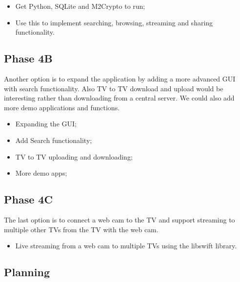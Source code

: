 \begin{itemize}
\item Get Python, SQLite and M2Crypto to run;
\item Use this to implement searching, browsing, streaming and sharing functionality.
\end{itemize}

\subsection*{Phase 4B}
Another option is to expand the application by adding a more advanced GUI with search functionality. 
Also TV to TV download and upload would be interesting rather than downloading from a central server. 
We could also add more demo applications and functions.

\begin{itemize}
\item Expanding the GUI;
\item Add Search functionality;
\item TV to TV uploading and downloading;
\item More demo apps;
\end{itemize}

\subsection*{Phase 4C}
The last option is to connect a web cam to the TV and support streaming to multiple other 
TV\textquotesingle s from the TV with the web cam.

\begin{itemize}
\item Live streaming from a web cam to multiple TV\textquotesingle s using the libswift library.
\end{itemize}

\subsection*{Planning}

